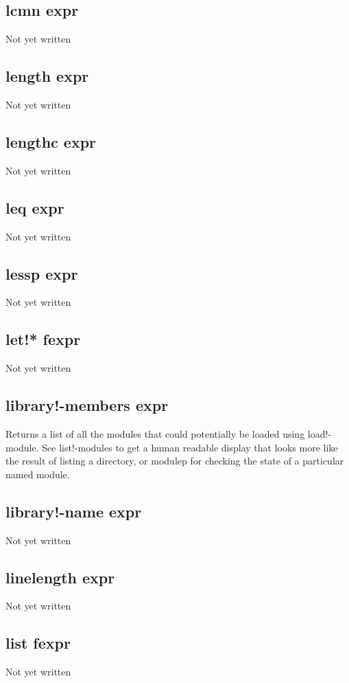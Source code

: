 \documentclass[a4paper,11pt]{article}
\begin{document}
{\subsection{\ttfamily lcmn expr}
Not yet written

\subsection{\ttfamily length expr}
Not yet written

\subsection{\ttfamily lengthc expr}
Not yet written

\subsection{\ttfamily leq expr}
Not yet written

\subsection{\ttfamily lessp expr}
Not yet written

\subsection{\ttfamily let!* fexpr}
Not yet written

\subsection{\ttfamily library!-members expr}
Returns a list of all the modules that could potentially be loaded using
{\ttfamily load!-module}. See {\ttfamily list!-modules} to get a human
readable display that looks more like the result of listing a directory, or
{\ttfamily modulep} for checking the state of a particular named module.
  

\subsection{\ttfamily library!-name expr}
Not yet written

\subsection{\ttfamily linelength expr}
Not yet written

\subsection{\ttfamily list fexpr}
Not yet written

}
\end{document}
